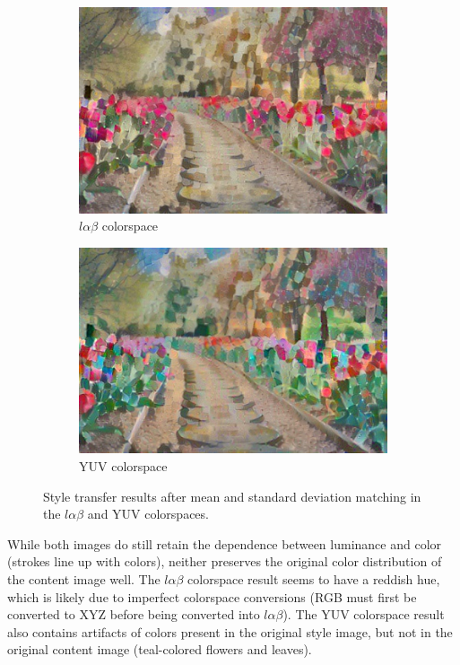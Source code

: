 \documentclass[10pt,twocolumn,letterpaper]{article}
\begin{document}
\begin{figure}[ht]
\centering
\begin{subfigure}[b]{0.49\linewidth}
  \centering
  \includegraphics[width=\linewidth]{imgs/flowers-lab-lin.jpg}
  \caption{$l\alpha\beta$ colorspace}
\end{subfigure}
\begin{subfigure}[b]{0.49\linewidth}
  \centering
  \includegraphics[width=\linewidth]{imgs/flowers-ycbcr-lin.jpg}
  \caption{YUV colorspace}
\end{subfigure}
\caption{Style transfer results after mean and standard deviation matching in the $l\alpha\beta$ and YUV colorspaces.}
\label{fig:color-result}
\end{figure}

While both images do still retain the dependence between luminance and color (strokes line up with colors), neither preserves the original color distribution of the content image well. The $l\alpha\beta$ colorspace result seems to have a reddish hue, which is likely due to imperfect colorspace conversions (RGB must first be converted to XYZ before being converted into $l\alpha\beta$). The YUV colorspace result also contains artifacts of colors present in the original style image, but not in the original content image (teal-colored flowers and leaves).
\end{document}

